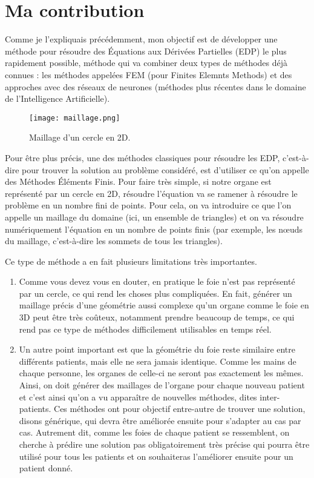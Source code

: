 \section{Ma contribution} \label{intro_contrib}

Comme je l’expliquais précédemment, mon objectif est de développer une méthode pour résoudre des Équations aux Dérivées Partielles (EDP) le plus rapidement possible, méthode qui va combiner deux types de méthodes déjà connues : les méthodes appelées FEM (pour Finites Elemnts Methods) et des approches avec des réseaux de neurones (méthodes plus récentes dans le domaine de l’Intelligence Artificielle).

\begin{minipage}{0.38\linewidth}
	\begin{figure}[H]
		\centering
		\texttt{[image: maillage.png]}
		\caption{Maillage d'un cercle en 2D.}
	\end{figure}
\end{minipage}
\begin{minipage}{0.58\linewidth}
	Pour être plus précis, une des méthodes classiques pour résoudre les EDP, c’est-à-dire pour trouver la solution au problème considéré, est d’utiliser ce qu’on appelle des Méthodes Éléments Finis. Pour faire très simple, si notre organe est représenté par un cercle en 2D, résoudre l’équation va se ramener à résoudre le problème en un nombre fini de points. Pour cela, on va introduire ce que l’on appelle un maillage du domaine (ici, un ensemble de triangles) et on va résoudre numériquement l’équation en un nombre de points finis (par exemple, les nœuds du maillage, c'est-à-dire les sommets de tous les triangles).
\end{minipage}

Ce type de méthode a en fait plusieurs limitations très importantes. 
\begin{enumerate}[label=\textbullet]
	\item Comme vous devez vous en douter, en pratique le foie n’est pas représenté par un cercle, ce qui rend les choses plus compliquées. En fait, générer un maillage précis d’une géométrie aussi complexe qu’un organe comme le foie en 3D peut être très coûteux, notamment prendre beaucoup de temps, ce qui rend pas ce type de méthodes difficilement utilisables en temps réel. 
	\item Un autre point important est que la géométrie du foie reste similaire entre différents patients, mais elle ne sera jamais identique. Comme les mains de chaque personne, les organes de celle-ci ne seront pas exactement les mêmes. Ainsi, on doit générer des maillages de l’organe pour chaque nouveau patient et c’est ainsi qu’on a vu apparaître de nouvelles méthodes, dites inter-patients. Ces méthodes ont pour objectif entre-autre de trouver une solution, disons générique, qui devra être améliorée ensuite pour s'adapter au cas par cas. Autrement dit, comme les foies de chaque patient se ressemblent, on cherche à prédire une solution pas obligatoirement très précise qui pourra être utilisé pour tous les patients et on souhaiteras l'améliorer ensuite pour un patient donné.
\end{enumerate}

